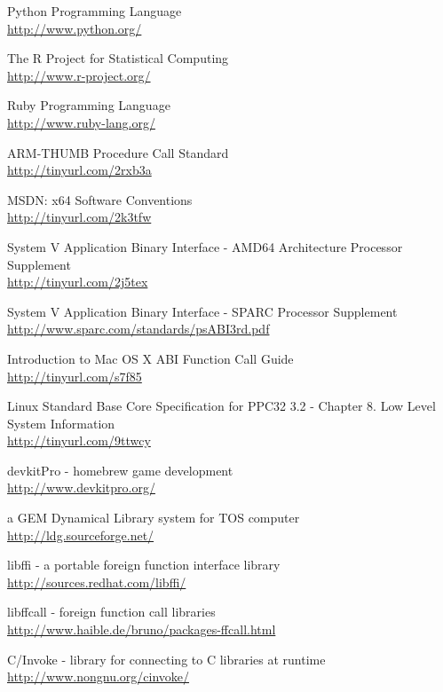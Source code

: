 \begin{thebibliography}{14}
	Python Programming Language\\
	\url{http://www.python.org/}

	The R Project for Statistical Computing\\
	\url{http://www.r-project.org/}

	Ruby Programming Language\\
	\url{http://www.ruby-lang.org/}

	ARM-THUMB Procedure Call Standard\\
	\url{http://tinyurl.com/2rxb3a}

	MSDN: x64 Software Conventions\\
	\url{http://tinyurl.com/2k3tfw}

	System V Application Binary Interface - AMD64 Architecture Processor Supplement\\
	\url{http://tinyurl.com/2j5tex}

	System V Application Binary Interface - SPARC Processor Supplement\\
	\url{http://www.sparc.com/standards/psABI3rd.pdf}

	Introduction to Mac OS X ABI Function Call Guide\\
	\url{http://tinyurl.com/s7f85}

	Linux Standard Base Core Specification for PPC32 3.2 - Chapter 8. Low Level System Information\\
	\url{http://tinyurl.com/9ttwcy}

	devkitPro - homebrew game development\\
	\url{http://www.devkitpro.org/}

	a GEM Dynamical Library system for TOS computer\\
	\url{http://ldg.sourceforge.net/}

	libffi - a portable foreign function interface library\\
	\url{http://sources.redhat.com/libffi/}

	libffcall - foreign function call libraries\\
	\url{http://www.haible.de/bruno/packages-ffcall.html}

	C/Invoke - library for connecting to C libraries at runtime\\
	\url{http://www.nongnu.org/cinvoke/}

\end{thebibliography}

